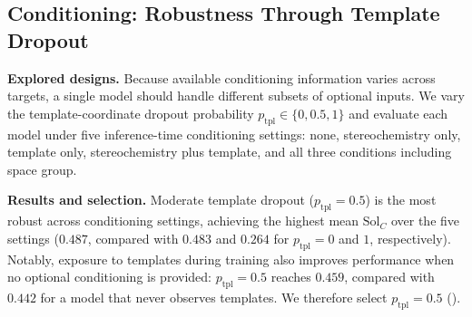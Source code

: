 \subsection{Conditioning: Robustness Through Template Dropout}
\label{sec:recipe-conditioning}

\textbf{Explored designs.}
Because available conditioning information varies across targets, a single model should handle different subsets of optional inputs. We vary
the template-coordinate dropout probability
$p_{\mathrm{tpl}}\in\{0,0.5,1\}$ and evaluate each model under five
inference-time conditioning settings: none, stereochemistry only, template only,
stereochemistry plus template, and all three conditions including space group.

\textbf{Results and selection.}
Moderate template dropout ($p_{\mathrm{tpl}}=0.5$) is the most robust across
conditioning settings, achieving the highest mean $\mathrm{Sol}_C$ over the five
settings ($0.487$, compared with $0.483$ and $0.264$ for
$p_{\mathrm{tpl}}=0$ and $1$, respectively). Notably, exposure to templates
during training also improves performance when no optional conditioning is
provided: $p_{\mathrm{tpl}}=0.5$ reaches $0.459$, compared with $0.442$ for a
model that never observes templates. We therefore select
$p_{\mathrm{tpl}}=0.5$ ().


